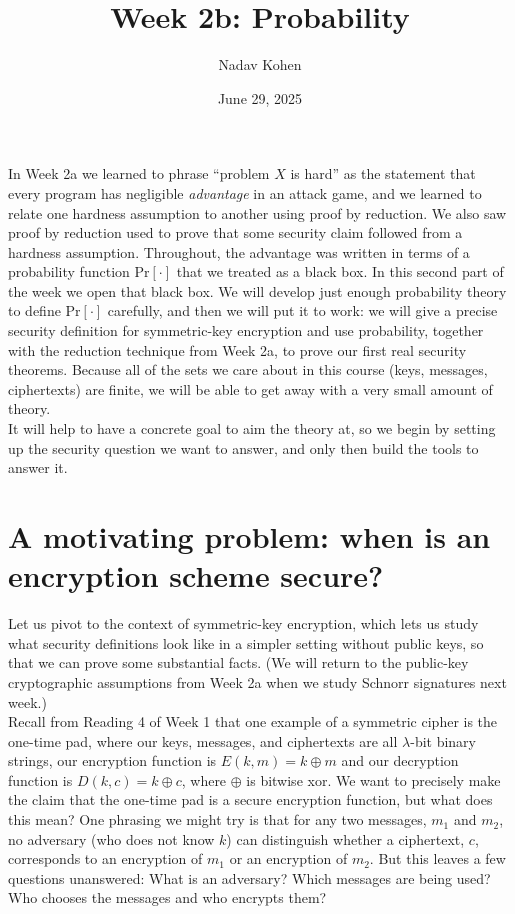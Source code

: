 \documentclass[12pt]{article}
\newcommand{\pr}[1]{\text{Pr}\left[#1\right]}
\theoremstyle{definition}
\theoremstyle{remark}
\theoremstyle{definition}
\begin{document}
\title{Week 2b: Probability}
\author{Nadav Kohen}
\date{June 29, 2025}
\maketitle

In Week 2a we learned to phrase ``problem $X$ is hard'' as the statement that every program has negligible \emph{advantage} in an attack game, and we learned to relate one hardness assumption to another using proof by reduction. We also saw proof by reduction used to prove that some security claim followed from a hardness assumption. Throughout, the advantage was written in terms of a probability function $\pr{\cdot}$ that we treated as a black box. In this second part of the week we open that black box. We will develop just enough probability theory to define $\pr{\cdot}$ carefully, and then we will put it to work: we will give a precise security definition for symmetric-key encryption and use probability, together with the reduction technique from Week 2a, to prove our first real security theorems. Because all of the sets we care about in this course (keys, messages, ciphertexts) are finite, we will be able to get away with a very small amount of theory.\\

It will help to have a concrete goal to aim the theory at, so we begin by setting up the security question we want to answer, and only then build the tools to answer it.

\section*{A motivating problem: when is an encryption scheme secure?}

Let us pivot to the context of symmetric-key encryption, which lets us study what security definitions look like in a simpler setting without public keys, so that we can prove some substantial facts. (We will return to the public-key cryptographic assumptions from Week 2a when we study Schnorr signatures next week.)\\

Recall from Reading 4 of Week 1 that one example of a symmetric cipher is the one-time pad, where our keys, messages, and ciphertexts are all $\lambda$-bit binary strings, our encryption function is $E(k, m) = k\oplus m$ and our decryption function is $D(k, c) = k\oplus c$, where $\oplus$ is bitwise xor. We want to precisely make the claim that the one-time pad is a secure encryption function, but what does this mean? One phrasing we might try is that for any two messages, $m_1$ and $m_2$, no adversary (who does not know $k$) can distinguish whether a ciphertext, $c$, corresponds to an encryption of $m_1$ or an encryption of $m_2$. But this leaves a few questions unanswered: What is an adversary? Which messages are being used? Who chooses the messages and who encrypts them?\\
\end{document}
